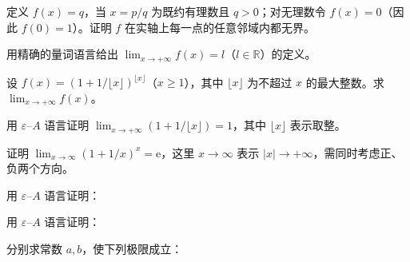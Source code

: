 \noindent\begin{minipage}{\textwidth}
定义 $f(x)=q$，当 $x=p/q$ 为既约有理数且 $q>0$；对无理数令 $f(x)=0$（因此 $f(0)=1$）。证明 $f$ 在实轴上每一点的任意邻域内都无界。
\end{minipage}\par\vfill
\noindent\begin{minipage}{\textwidth}
用精确的量词语言给出 $\lim_{x\to+\infty}f(x)=l$（$l\in\mathbb R$）的定义。
\end{minipage}\par\vfill
\newpage
\noindent\begin{minipage}{\textwidth}
设 $f(x)=(1+1/\lfloor x\rfloor)^{\lfloor x\rfloor}$（$x\ge1$），其中 $\lfloor x\rfloor$ 为不超过 $x$ 的最大整数。求 $\lim_{x\to+\infty}f(x)$。
\end{minipage}\par\vfill
\noindent\begin{minipage}{\textwidth}
用 $\varepsilon$--$A$ 语言证明 $\lim_{x\to+\infty}(1+1/\lfloor x\rfloor)=1$，其中 $\lfloor x\rfloor$ 表示取整。
\end{minipage}\par\vfill
\noindent\begin{minipage}{\textwidth}
证明 $\lim_{x\to\infty}(1+1/x)^x=\mathrm e$，这里 $x\to\infty$ 表示 $|x|\to+\infty$，需同时考虑正、负两个方向。
\end{minipage}\par\vfill
\newpage
\noindent\begin{minipage}{\textwidth}
用 $\varepsilon$--$A$ 语言证明：
\end{minipage}\par\vfill
\noindent\begin{minipage}{\textwidth}
用 $\varepsilon$--$A$ 语言证明：
\end{minipage}\par\vfill
\noindent\begin{minipage}{\textwidth}
分别求常数 $a,b$，使下列极限成立：
\end{minipage}\par\vfill
